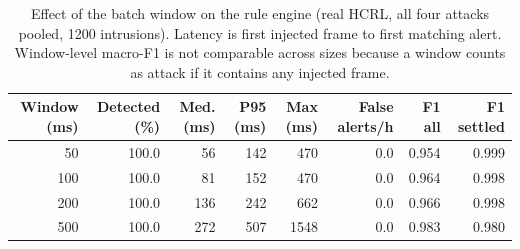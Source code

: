 \begin{table}[t]
\centering
\footnotesize
\caption{Effect of the batch window on the rule engine (real HCRL, all four attacks pooled, 1200 intrusions). Latency is first injected frame to first matching alert. Window-level macro-F1 is not comparable across sizes because a window counts as attack if it contains any injected frame.}
\label{tab:hcrl_window}
\begin{tabular}{rrrrrrrr}
\toprule
Window (ms) & Detected (\%) & Med. (ms) & P95 (ms) & Max (ms) & False alerts/h & F1 all & F1 settled \\
\midrule
50 & 100.0 & 56 & 142 & 470 & 0.0 & 0.954 & 0.999 \\
100 & 100.0 & 81 & 152 & 470 & 0.0 & 0.964 & 0.998 \\
200 & 100.0 & 136 & 242 & 662 & 0.0 & 0.966 & 0.998 \\
500 & 100.0 & 272 & 507 & 1548 & 0.0 & 0.983 & 0.980 \\
\bottomrule
\end{tabular}
\end{table}
